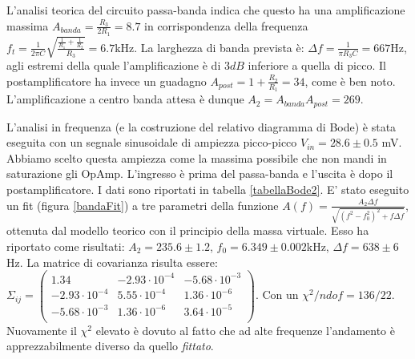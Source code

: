 \documentclass[10pt,a4paper]{article}
\begin{document}
L'analisi teorica del circuito passa-banda indica che questo ha una amplificazione massima $A_{banda} = \frac{R_3}{2 R_1} = 8.7$ in corrispondenza della frequenza $f_t = \frac{1}{2 \pi C} \sqrt{\frac{\frac{1}{R_1} + \frac{1}{R_2}}{R_3}} = 6.7 \mbox{kHz}$. %
La larghezza di banda prevista è: $\Delta f = \frac{1}{\pi R_3 C} = 667$Hz, agli estremi della quale l'amplificazione è di $3 dB$ inferiore a quella di picco. Il postamplificatore ha invece un guadagno $A_{post} = 1 + \frac{R_2}{R_1} = 34$, come è ben noto. L'amplificazione a centro banda attesa è dunque $A_{2} = A_{banda} A_{post} = 269$.

L'analisi in frequenza (e la costruzione del relativo diagramma di Bode) è stata eseguita con un segnale sinusoidale di ampiezza picco-picco $V_{in} = 28.6 \pm 0.5$ mV. Abbiamo scelto questa ampiezza come la massima possibile che non mandi in saturazione gli OpAmp. L'ingresso è prima del passa-banda e l'uscita è dopo il postamplificatore. I dati sono riportati in tabella \ref{tabellaBode2}.
E' stato eseguito un fit (figura \ref{bandaFit}) a tre parametri della funzione $A(f) = \frac{A_2 \Delta f}{\sqrt{(f^2-f_0^2)^2+f \Delta f}}$, ottenuta dal modello teorico con il principio della massa virtuale. Esso ha riportato come risultati: $A_2 = 235.6 \pm 1.2$, $f_0 = 6.349 \pm 0.002$kHz, $\Delta f = 638 \pm 6$Hz. La matrice di covarianza risulta essere: $ \Sigma_{ij} = \left( \begin{array}{ccc}
1.34 & -2.93 \cdot 10^{-4} & -5.68 \cdot 10^{-3}\\ 
-2.93 \cdot 10^{-4} & 5.55 \cdot 10^{-4} & 1.36 \cdot 10^{-6}\\
-5.68 \cdot 10^{-3} & 1.36 \cdot 10^{-6} & 3.64 \cdot 10^{-5}\\
\end{array} \right)$. Con un $\chi^2/ndof = 136/22$.\\
Nuovamente il $\chi^2$ elevato è dovuto al fatto che ad alte frequenze l'andamento è apprezzabilmente diverso da quello \emph{fittato}.
\end{document}
